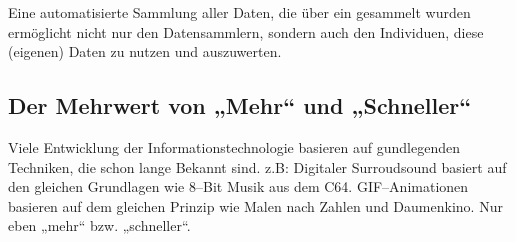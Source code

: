 Eine automatisierte Sammlung aller Daten, die über ein  gesammelt wurden ermöglicht nicht nur den Datensammlern, sondern auch den Individuen, diese (eigenen) Daten zu nutzen und auszuwerten.

\subsection{Der Mehrwert von „Mehr“ und „Schneller“}

Viele Entwicklung der Informationstechnologie basieren auf gundlegenden Techniken, die schon lange Bekannt sind. z.B: Digitaler Surroudsound basiert auf den gleichen Grundlagen wie 8–Bit Musik aus dem C64. GIF–Animationen basieren auf dem gleichen Prinzip wie Malen nach Zahlen und Daumenkino. Nur eben „mehr“ bzw. „schneller“. 